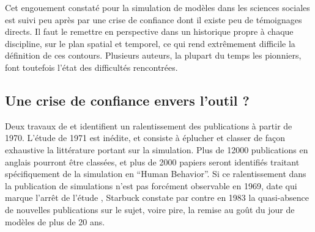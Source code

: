 

Cet engouement constaté pour la simulation de modèles dans les sciences sociales est suivi peu après par une crise de confiance dont il existe peu de témoignages directs. Il faut le remettre en perspective dans un historique propre à chaque discipline, sur le plan spatial et temporel, ce qui rend extrêmement difficile la définition de ces contours. Plusieurs auteurs, la plupart du temps les pionniers, font toutefois l'état des difficultés rencontrées.


\subsection{Une crise de confiance envers l'outil ?}
\label{sec:critiques_simulation}

Deux travaux de \textcite{Dutton1971} et \textcite{Starbuck1983} identifient un ralentissement des publications à partir de 1970. L'étude de 1971 est inédite, et consiste à éplucher et classer de façon exhaustive la littérature portant sur la simulation. Plus de 12000 publications en anglais pourront être classées, et plus de 2000 papiers seront identifiés traitant spécifiquement de la simulation en \foreignquote{english}{Human Behavior}. Si ce ralentissement dans la publication de simulations n'est pas forcément observable en 1969, date qui marque l'arrêt de l'étude , Starbuck constate par contre en 1983 la quasi-absence de nouvelles publications sur le sujet, voire pire, la remise au goût du jour de modèles de plus de 20 ans.

